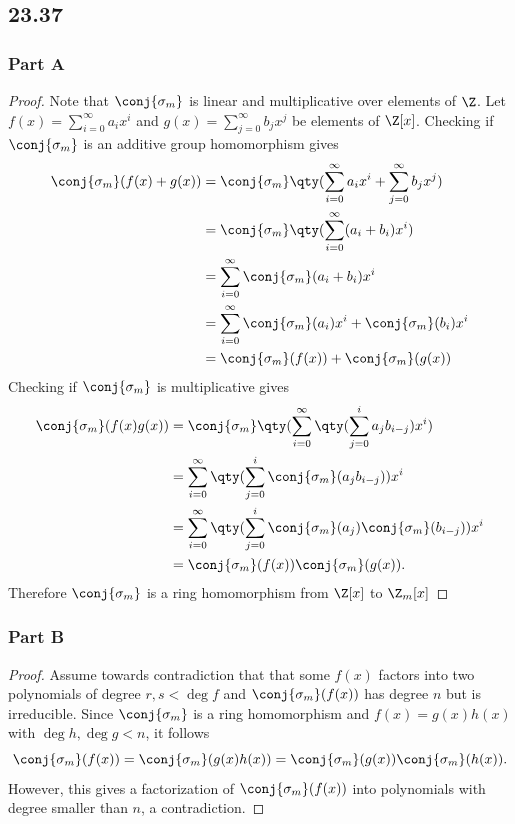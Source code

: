 \documentclass[12pt,titlepage]{extarticle}
\begin{document}
\subsection*{23.37}
\begin{@empty}
\newcommand{\homo}[1][m]{\conj{\sigma_{#1}}}

\subsubsection*{Part A}
\begin{proof}
    Note that $\homo$ is linear and multiplicative over elements of $\Z$. Let $f(x) = \sum_{i=0}^\infty a_i x^i$ and $g(x) = \sum_{j=0}^\infty b_j x^j$ be elements of $\Z[x]$. Checking if $\homo$ is an additive group homomorphism gives
    \begin{align*}
        \homo(f(x) + g(x)) &= \homo\qty(\sum_{i=0}^\infty a_i x^i + \sum_{j=0}^\infty b_j x^j) \\
                           &= \homo\qty(\sum_{i=0}^\infty (a_i + b_i) x^i) \\
                           &= \sum_{i=0}^\infty \homo(a_i + b_i) x^i \\
                           &= \sum_{i=0}^\infty \homo(a_i) x^i + \homo(b_i) x^i \\
                           &= \homo(f(x)) + \homo(g(x))
    \end{align*}
    Checking if $\homo$ is multiplicative gives
    \begin{align*}
        \homo(f(x) g(x)) &= \homo\qty(\sum_{i=0}^\infty \qty(\sum_{j=0}^i a_j b_{i-j}) x^i) \\
        &= \sum_{i=0}^\infty \qty(\sum_{j=0}^i \homo(a_j b_{i-j})) x^i \\
        &= \sum_{i=0}^\infty \qty(\sum_{j=0}^i \homo(a_j) \homo(b_{i-j})) x^i \\
        &= \homo(f(x)) \homo(g(x))
    .\end{align*}
    Therefore $\homo$ is a ring homomorphism from $\Z[x]$ to $\Z_{m}[x]$
\end{proof}

\subsubsection*{Part B}
\begin{proof}
    Assume towards contradiction that that some $f(x)$ factors into two polynomials of degree $r,s < \deg f$ and $\homo(f(x))$ has degree $n$ but is irreducible. Since $\homo$ is a ring homomorphism and $f(x) = g(x) h(x)$ with $\deg h, \deg g < n$, it follows
    \[
        \homo(f(x)) = \homo(g(x) h(x)) =  \homo(g(x)) \homo(h(x))
    .\]
    However, this gives a factorization of $\homo(f(x))$ into polynomials with degree smaller than $n$, a contradiction.
\end{proof}


\end{@empty}
\end{document}
